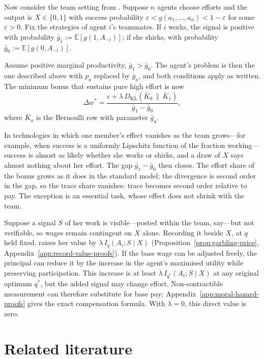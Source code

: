 \documentclass[11pt,a4paper]{article}
\theoremstyle{definition}
\newcommand{\E}{\mathbb E}
\newcommand{\I}{I}
\newcommand{\KL}{D_{\mathrm{KL}}}
\newcommand{\1}{\mathbf 1}
\begin{document}
Now consider the team setting from \cite{Holmstrom1982}. Suppose $n$ agents choose efforts and the output is $X\in\{0,1\}$  with success probability $\varepsilon < g(a_1,\ldots,a_n) < 1-\varepsilon$ for some $\varepsilon>0$. Fix the
strategies of agent $i$'s teammates.  If $i$ works, the signal is positive with probability
$\bar g_1:=\E[g(1,A_{-i})]$; if she shirks, with probability $\bar g_0:=\E[g(0,A_{-i})]$.

Assume positive marginal productivity, $\bar g_1>\bar g_0$. The agent's problem is then the one described above with $p_a$ replaced by $\bar g_a$, and both conditions apply as written.  The minimum bonus that sustains pure high effort is now
\[
 \Delta w^*=\frac{c+\lambda\,\KL(\bar K_0\,\|\,\bar K_1)}{\bar g_1-\bar g_0},
\]
where $\bar K_a$ is the Bernoulli row with parameter $\bar g_a$.

In technologies in which one member's effect vanishes as the team grows---for example, when success is a uniformly Lipschitz function of the fraction working---success is almost as likely whether she works or shirks, and a draw of $X$
says almost nothing about her effort.
The gap $\bar g_1-\bar g_0$ then closes.  The effort share of the bonus grows as it does in the standard
model; the divergence is second order in the gap, so the trace share vanishes: trace becomes second order
relative to pay.  The exception is an essential task, whose effect does not shrink with the team.

Suppose a signal $S$ of her work is visible---posted within the team, say---but not verifiable, so wages
remain contingent on $X$ alone.  Recording it beside $X$, at $q$ held fixed, raises her value by
$\lambda\,\I_q(A_i;S\mid X)$ (Proposition~\ref{prop:garbling-price}, Appendix~\ref{app:record-value-proofs}).
If the base wage can be adjusted freely, the principal can reduce it by the increase in the agent's maximised utility while preserving participation. This increase is at least $\lambda\,\I_{q^*}(A_i;S\mid X)$ at any original optimum $q^*$, but the added signal may change effort. Non-contractible measurement can therefore substitute for base pay; Appendix~\ref{app:moral-hazard-proofs} gives the exact compensation formula. With $\lambda=0$, this direct value is zero.


\section{Related literature}\label{sec:literature}
\end{document}
